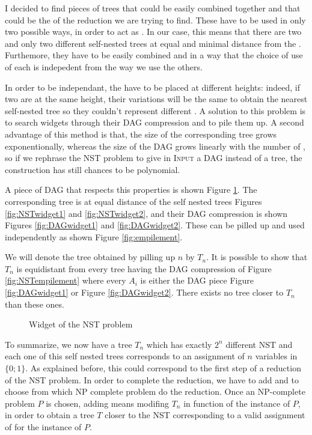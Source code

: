 I decided to find pieces of trees that could be easily combined
together and that could be the \widgets of the reduction we are trying
to find. These \widgets have to be used in only two possible ways, in
order to act as \variables. In our case, this means that there are two
and only two different self-nested trees at equal and minimal distance
from the \widget. Furthemore, they have to be easily combined and in a
way that the choice of use of each \widget is indepedent from the way
we use the others.

In order to be independant, the \widgets have to be placed at
different heights: indeed, if two \widgets are at the same height,
their variations will be the same to obtain the nearest self-nested
tree so they couldn't represent different \variables. A solution to
this problem is to search widgets through their DAG compression and to
pile them up. A second advantage of this method is that, the size of
the corresponding tree grows exponentionally, whereas the size of the
DAG grows linearly with the number of \widgets, so if we rephrase the
NST problem to give in \textsc{Input} a DAG instead of a tree, the
construction has still chances to be polynomial.

A piece of DAG that respects this properties is shown Figure
\ref{fig:widget}. The corresponding tree is at equal distance of the
self nested trees Figures \ref{fig:NSTwidget1} and
\ref{fig:NSTwidget2}, and their DAG compression is shown Figures
\ref{fig:DAGwidget1} and \ref{fig:DAGwidget2}. These \widgets can be
pilled up and used independently as shown Figure
\ref{fig:empilement}. 

We will denote the tree obtained by pilling up
$n$ \widgets by $T_{n}$. It is possible to show that $T_{n}$ is
equidistant from every tree having the DAG compression of Figure
\ref{fig:NSTempilement} where every $A_{i}$ is either the DAG piece
Figure \ref{fig:DAGwidget1} or Figure \ref{fig:DAGwidget2}. There
exists no tree closer to $T_{n}$ than these ones. %

\begin{figure}
  \centering
  
  \caption{Widget of the NST problem}
  \label{fig:widget}
\end{figure}

To summarize, we now have a tree $T_{n}$ which has exactly $2^{n}$
different NST and each one of this self nested trees corresponds to an
assignment of $n$ variables in $\{0;1\}$. As explained before, this
could correspond to the first step of a reduction of the NST
problem. In order to complete the reduction, we have to add
\constraints and to choose from which NP complete problem do the
reduction. Once an NP-complete problem $P$ is chosen, adding \constraints
means modifing $T_{n}$ in function of the instance of $P$, in
order to obtain a tree $T$ closer to the NST corresponding to a
valid assignment of \variables for the instance of $P$.




